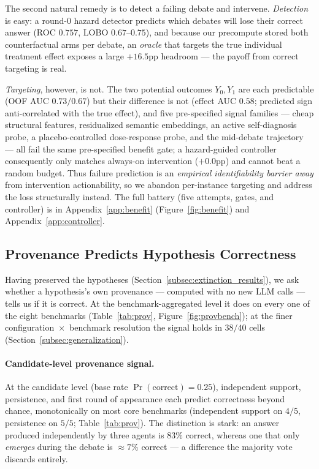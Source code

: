 The second natural remedy is to detect a failing debate and intervene. \emph{Detection} is easy: a round-$0$
hazard detector predicts which debates will lose their correct answer (ROC $0.757$, LOBO $0.67$--$0.75$), and
because our precompute stored both counterfactual arms per debate, an \emph{oracle} that targets the true
individual treatment effect exposes a large $+16.5$pp headroom --- the payoff from correct targeting is real.

\emph{Targeting}, however, is not. The two potential outcomes $Y_0,Y_1$ are each predictable (OOF AUC
$0.73/0.67$) but their difference is not (effect AUC $0.58$; predicted sign anti-correlated with the true
effect), and five pre-specified signal families --- cheap structural features, residualized semantic
embeddings, an active self-diagnosis probe, a placebo-controlled dose-response probe, and the mid-debate
trajectory --- all fail the same pre-specified benefit gate; a hazard-guided controller consequently only
matches always-on intervention ($+0.0$pp) and cannot beat a random budget. Thus failure prediction is an
\emph{empirical identifiability barrier away} from intervention actionability, so we abandon per-instance
targeting and address the loss structurally instead. The full battery (five attempts, gates, and controller)
is in Appendix~\ref{app:benefit} (Figure~\ref{fig:benefit}) and Appendix~\ref{app:controller}.


\subsection{Provenance Predicts Hypothesis Correctness}
\label{subsec:provenance_correctness}

Having preserved the hypotheses (Section~\ref{subsec:extinction_results}), we ask whether a hypothesis's own
provenance --- computed with no new LLM calls --- tells us if it is correct. At the benchmark-aggregated
level it does on every one of the eight benchmarks (Table~\ref{tab:prov}, Figure~\ref{fig:provbench}); at the
finer configuration~$\times$~benchmark resolution the signal holds in $38/40$ cells
(Section~\ref{subsec:generalization}).

\paragraph{Candidate-level provenance signal.}
\label{par:candidate_signal}
At the candidate level (base rate $\Pr(\text{correct})=0.25$), independent support, persistence, and first
round of appearance each predict correctness beyond chance, monotonically on most core benchmarks
(independent support on $4/5$, persistence on $5/5$; Table~\ref{tab:prov}). The distinction is
stark: an answer produced independently by three agents is $83\%$ correct, whereas one that only
\emph{emerges} during the debate is $\approx 7\%$ correct --- a difference the majority vote discards
entirely.


